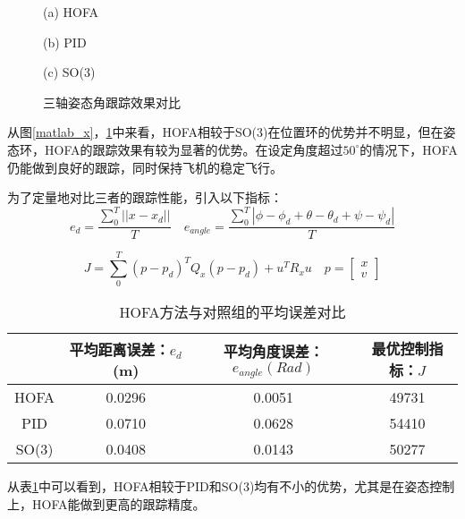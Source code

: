 \begin{figure}[h]
  \centering
  \begin{minipage}[t]{0.33\textwidth}
    \centering
    \caption*{(a) HOFA}
  \end{minipage}\hfill
  \begin{minipage}[t]{0.33\textwidth}
    \centering
    \caption*{(b) PID}
  \end{minipage}\hfill
  \begin{minipage}[t]{0.33\textwidth}
    \centering
    \caption*{(c) SO(3)}
  \end{minipage}
  \caption{三轴姿态角跟踪效果对比}
  \label{matlab_angle}
\end{figure}

从图\ref{matlab_x}，\ref{matlab_angle}中来看，HOFA相较于SO(3)在位置环的优势并不明显，但在姿态环，HOFA的跟踪效果有较为显著的优势。在设定角度超过$50^\circ$的情况下，HOFA仍能做到良好的跟踪，同时保持飞机的稳定飞行。

  
为了定量地对比三者的跟踪性能，引入以下指标：
  $$e_d=\frac{\sum_0^{T}||x-x_d||}{T} \quad e_{angle}=\frac{\sum_0^{T}|\phi-\phi_d+\theta-\theta_d+\psi-\psi_d|}{T}$$

  $$J=\sum_0^{T}(p-p_d)^T Q_x(p-p_d)+u^T R_x u \quad p=\begin{bmatrix}
    x \\ v
  \end{bmatrix}$$
  \begin{table}[h]
    \centering
    \caption{HOFA方法与对照组的平均误差对比}
    \begin{tabular}{cccc}
        \toprule
        & 平均距离误差：$e_d$ (m)& 平均角度误差：$e_{angle}(Rad)$  & 最优控制指标：$J$ \\
        \midrule
        HOFA & 0.0296 & 0.0051 &49731 \\
        PID & 0.0710 & 0.0628 &54410 \\
        SO(3) &0.0408  &0.0143 &50277 \\
        \bottomrule
    \end{tabular}

    \label{matlab对比}
\end{table}

从表\ref{matlab对比}中可以看到，HOFA相较于PID和SO(3)均有不小的优势，尤其是在姿态控制上，HOFA能做到更高的跟踪精度。

